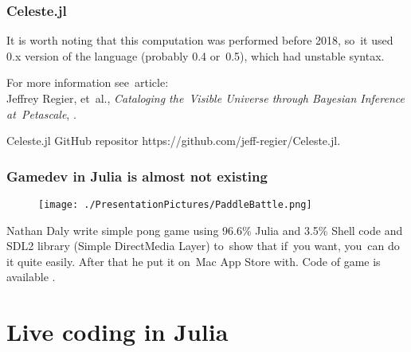 \documentclass[10pt,t]{beamer}
\begin{document}
\begin{frame}
  \frametitle{Celeste.jl}


  It is worth noting that this computation was performed before 2018,
  so~it used 0.x version of the language (probably 0.4 or~0.5), which
  had unstable syntax.

  For more information see~article: \\
  Jeffrey Regier, et~al.,
  \textit{Cataloging the~Visible Universe through Bayesian Inference
    at~Petascale},
  .

  Celeste.jl GitHub repositor
  {https://github.com/jeff-regier/Celeste.jl}.

\end{frame}





\begin{frame}
  \frametitle{Gamedev in Julia is almost not existing}


  \begin{figure}

    \centering

    \texttt{[image: ./PresentationPictures/PaddleBattle.png]}

  \end{figure}


  Nathan Daly write simple pong game using 96.6\% Julia and 3.5\%
  Shell code and SDL2 library (Simple DirectMedia Layer) to~show that
  if~you want, you~can do it quite easily. After that he put it on~Mac
  App Store with. Code of game is available
  .

\end{frame}










\section{Live coding in Julia}
\end{document}
